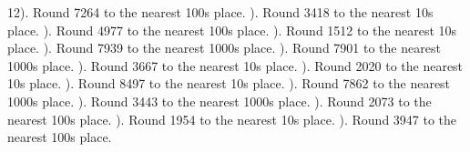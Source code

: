 \documentclass{article}%
\begin{document}
12). Round 7264 to the nearest 100s place.%
\newline%
\newline%
). Round 3418 to the nearest 10s place.%
\newline%
\newline%
). Round 4977 to the nearest 100s place.%
\newline%
\newline%
). Round 1512 to the nearest 10s place.%
\newline%
\newline%
). Round 7939 to the nearest 1000s place.%
\newline%
\newline%
). Round 7901 to the nearest 1000s place.%
\newline%
\newline%
). Round 3667 to the nearest 10s place.%
\newline%
\newline%
). Round 2020 to the nearest 10s place.%
\newline%
\newline%
). Round 8497 to the nearest 10s place.%
\newline%
\newline%
). Round 7862 to the nearest 1000s place.%
\newline%
\newline%
). Round 3443 to the nearest 1000s place.%
\newline%
\newline%
). Round 2073 to the nearest 100s place.%
\newline%
\newline%
). Round 1954 to the nearest 10s place.%
\newline%
\newline%
). Round 3947 to the nearest 100s place.%
\newline%
\end{document}
